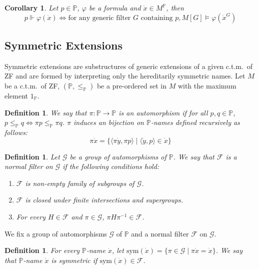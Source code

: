 \documentclass{report}
\newtheorem{dfn}[thm]{Definition}
\newtheorem{cor}[thm]{Corollary}
\begin{document}
\begin{cor}\label{cor:truth_lemma_cor}
  Let $p \in \mathbb{P}$, $\varphi$ be a formula and $\dot{x} \in M^{\mathbb{P}}$, then
  $$p \Vdash \varphi(\dot{x}) \Leftrightarrow \text{for any generic filter } G \text{ containing } p, M[G] \vDash \varphi(\dot{x}^G)$$
\end{cor}


\subsection{Symmetric Extensions}\label{subsection:symmetrc_extensions}
Symmetric extensions are substructures of generic extensions of a given c.t.m.\  of ZF 
and are formed by interpreting only the hereditarily symmetric names.
Let $M$ be a c.t.m.\  of ZF, $(\mathbb{P}, \leq_{\mathbb{P}})$ be a pre-ordered set in $M$ with the maximum element $1_{\mathbb{P}}$.

\begin{dfn} \label{dfn:automorphism}
  We say that $\pi : \mathbb{P} \rightarrow \mathbb{P}$ is an \emph{automorphism} if for all $p, q \in \mathbb{P}$, $p \leq_{\mathbb{P}} q \Leftrightarrow \pi p \leq_{\mathbb{P}} \pi q$.
  $\pi$ induces an bijection on $\mathbb{P}$-names defined recursively as follows:
  $$ \pi \dot{x} = \{ \langle \pi \dot{y}, \pi p \rangle \mid \langle \dot{y}, p \rangle \in \dot{x} \} $$
\end{dfn}

\begin{dfn} 
  Let $\mathcal{G}$ be a group of automorphisms of $\mathbb{P}$. We say that $\mathcal{F}$ is a \emph{normal filter} on $\mathcal{G}$ if the following conditions hold:
  \begin{enumerate}
    \item $\mathcal{F}$ is non-empty family of subgroups of $\mathcal{G}$.
    \item $\mathcal{F}$ is closed under finite intersections and supergroups.
    \item For every $H \in \mathcal{F}$ and $\pi \in \mathcal{G}$, $\pi H \pi^{-1} \in \mathcal{F}$.
  \end{enumerate}
\end{dfn}

We fix a group of automorphisms $\mathcal{G}$ of $\mathbb{P}$ and a normal filter $\mathcal{F}$ on $\mathcal{G}$.
\begin{dfn} 
  For every $\mathbb{P}$-name $\dot{x}$, let $\mathrm{sym}(\dot{x}) = \{ \pi \in \mathcal{G} \mid \pi \dot{x} = \dot{x} \}$.
  We say that $\mathbb{P}$-name $\dot{x}$ is \emph{symmetric} if $\mathrm{sym}(\dot{x}) \in \mathcal{F}$.
\end{dfn}
\end{document}
